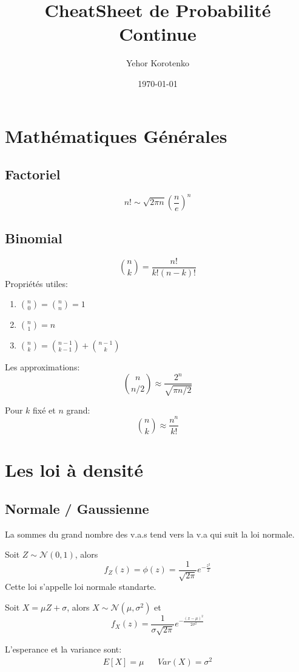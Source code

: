 \documentclass[a4paper]{article}
\title{CheatSheet de Probabilité Continue}
\author{Yehor Korotenko}
\date{\today}
\begin{document}
\maketitle
\section{Mathématiques Générales} 
\subsection{Factoriel}
\[
    n! \sim \sqrt{2\pi n}\left(\frac{n}{e}\right)^n 
\] 

\subsection{Binomial}
\[
    \binom{n}{k} = \frac{n!}{k!(n-k)!}
\] 
Propriétés utiles:
\begin{enumerate}
    \item $\binom{n}{0} = \binom{n}{n} = 1$
    \item $\binom{n}{1} = n$ 
    \item $\binom{n}{k} = \binom{n-1}{k-1} + \binom{n-1}{k}$
\end{enumerate}

Les approximations:
\[
    \binom{n}{n/2}\approx \frac{2^n}{\sqrt{\pi n/2}}
\] 

Pour $k$ fixé et  $n$ grand:
 \[
     \binom{n}{k} \approx \frac{n^n}{k!}
\] 

\section{Les loi à densité}%
\label{sec:Les loi à densité}
\subsection{Normale / Gaussienne}
La sommes du grand nombre des v.a.s tend vers la v.a qui suit la loi normale.

Soit $Z \sim \mathcal{N}(0, 1)$, alors
 \[
     f_Z(z) = \phi(z) = \frac{1}{\sqrt{2 \pi} }e^{-\frac{z^2}{2}}
\] 
Cette loi s'appelle loi normale standarte.

Soit $X = \mu Z + \sigma$, alors  $X \sim \mathcal{N}(\mu, \sigma^2)$ et 
 \[
     f_X(z) = \frac{1}{\sigma \sqrt{2 \pi} }e^{- \frac{(x - \mu)^2}{2\sigma^2}}
\] 

L'esperance et la variance sont:
\begin{align*}
    E[X] = \mu & & Var(X) = \sigma^2
\end{align*}
\end{document}
